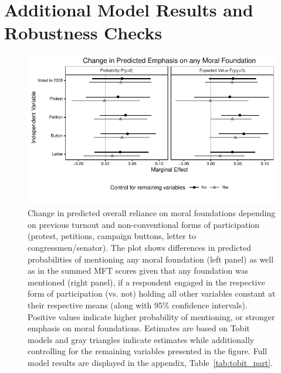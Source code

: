 \documentclass[12pt]{article}
\begin{document}
\clearpage
\section{Additional Model Results and Robustness Checks}\label{app:robust}
\renewcommand\thefigure{\thesection.\arabic{figure}}
\renewcommand\thetable{\thesection.\arabic{table}}
\setcounter{figure}{0}
\setcounter{table}{0}


\begin{figure}[h]\centering
\includegraphics{../calc/fig/tobit_part.pdf}
\caption{Change in predicted overall reliance on moral foundations depending on previous turnout and non-conventional forms of participation (protest, petitions, campaign buttons, letter to congressmen/senator). The plot shows differences in predicted probabilities of mentioning any moral foundation (left panel) as well as in the summed MFT scores given that any foundation was mentioned (right panel), if a respondent engaged in the respective form of participation (vs. not) holding all other variables constant at their respective means (along with 95\% confidence intervals). Positive values indicate higher probability of mentioning, or stronger emphasis on moral foundations. Estimates are based on Tobit models and gray triangles indicate estimates while additionally controlling for the remaining variables presented in the figure. Full model results are displayed in the appendix, Table~\ref{tab:tobit_part}.
}\label{fig:tobit_part}
\end{figure}
\end{document}
